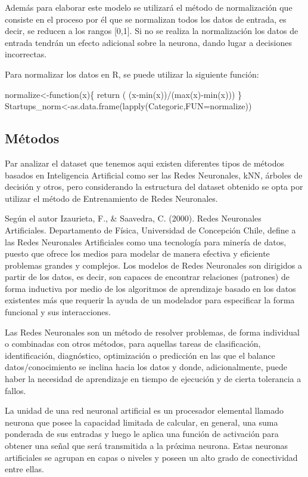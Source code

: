 \documentclass[Iberoamerican Journal of Industrial
Engineering,article,submit,moreauthors,pdftex]{Definitions/mdpi}
\begin{document}
Además para elaborar este modelo se utilizará el método de normalización
que consiste en el proceso por él que se normalizan todos los datos de
entrada, es decir, se reducen a los rangos {[}0,1{]}. Si no se realiza
la normalización los datos de entrada tendrán un efecto adicional sobre
la neurona, dando lugar a decisiones incorrectas.

Para normalizar los datos en R, se puede utilizar la siguiente función:

normalize\textless-function(x)\{ return ( (x-min(x))/(max(x)-min(x))) \}
Startups\_norm\textless-as.data.frame(lapply(Categoric,FUN=normalize))

\hypertarget{muxe9todos}{%
\subsection{Métodos}\label{muxe9todos}}

Par analizar el dataset que tenemos aqui existen diferentes tipos de
métodos basados en Inteligencia Artificial como ser las Redes
Neuronales, kNN, árboles de decisión y otros, pero considerando la
estructura del dataset obtenido se opta por utilizar el método de
Entrenamiento de Redes Neuronales.

Según el autor Izaurieta, F., \& Saavedra, C. (2000). Redes Neuronales
Artificiales. Departamento de Física, Universidad de Concepción Chile,
define a las Redes Neuronales Artificiales como una tecnología para
minería de datos, puesto que ofrece los medios para modelar de manera
efectiva y eficiente problemas grandes y complejos. Los modelos de Redes
Neuronales son dirigidos a partir de los datos, es decir, son capaces de
encontrar relaciones (patrones) de forma inductiva por medio de los
algoritmos de aprendizaje basado en los datos existentes más que
requerir la ayuda de un modelador para especificar la forma funcional y
sus interacciones.

Las Redes Neuronales son un método de resolver problemas, de forma
individual o combinadas con otros métodos, para aquellas tareas de
clasificación, identificación, diagnóstico, optimización o predicción en
las que el balance datos/conocimiento se inclina hacia los datos y
donde, adicionalmente, puede haber la necesidad de aprendizaje en tiempo
de ejecución y de cierta tolerancia a fallos.

La unidad de una red neuronal artificial es un procesador elemental
llamado neurona que posee la capacidad limitada de calcular, en general,
una suma ponderada de sus entradas y luego le aplica una función de
activación para obtener una señal que será transmitida a la próxima
neurona. Estas neuronas artificiales se agrupan en capas o niveles y
poseen un alto grado de conectividad entre ellas.
\end{document}
